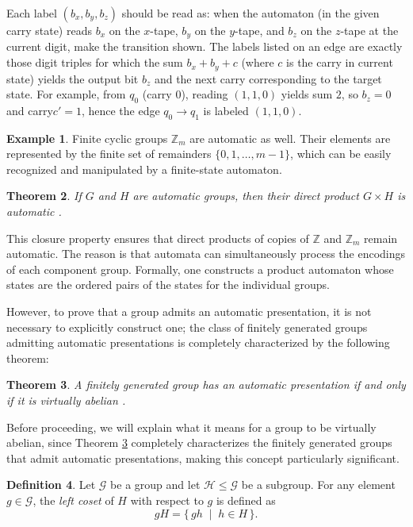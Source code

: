 \documentclass{pracalicmgr2025}
\theoremstyle{plain}            %
\newtheorem{theorem}{Theorem}[chapter]
\theoremstyle{remark}           %
\theoremstyle{definition}       %
\newtheorem{example}[theorem]{Example}
\newtheorem{definition}[theorem]{Definition}
\begin{document}
Each label $(b_x,b_y,b_z)$ should be read as: when the automaton (in the given carry state) reads $b_x$ on the $x$-tape, $b_y$ on the $y$-tape, and $b_z$ on the $z$-tape at the current digit, make the transition shown. The labels listed on an edge are exactly those digit triples for which the sum $b_x+b_y+c$ (where $c$ is the carry in current state) yields the output bit $b_z$ and the next carry corresponding to the target state. For example, from $q_0$ (carry $0$), reading $(1,1,0)$ yields sum $2$, so $b_z=0$ and carry$c' =1$, hence the edge $q_0\to q_1$ is labeled $(1,1,0)$.
\bigskip

\begin{example}
Finite cyclic groups $\mathbb{Z}_m$ are automatic as well.  
Their elements are represented by the finite set of remainders $\{0,1,\dots,m-1\}$, which can be 
easily recognized and manipulated by a finite-state automaton. 
\end{example}

\begin{theorem}
If $G$ and $H$ are automatic groups, then their direct product $G \times H$ is automatic \cite{hopcroft2001introduction}. 
\end{theorem}

This closure property ensures that direct products of copies of $\mathbb{Z}$ and $\mathbb{Z}_m$ remain automatic.  
The reason is that automata can simultaneously process the encodings of each component group. 
Formally, one constructs a product automaton whose states are the ordered pairs of the states for the individual groups.



However, to prove that a group admits an automatic presentation, it is not necessary to explicitly construct one; the class of finitely generated groups admitting automatic presentations is completely characterized by the following theorem:
\begin{theorem} \label{virtully abelina}
    A finitely generated group has an automatic presentation if and only if it is virtually abelian \cite{OliverGraham2005}.
\end{theorem}
Before proceeding, we will explain what it means for a group to be virtually abelian, since Theorem \ref{virtully abelina} completely characterizes the finitely generated groups that admit automatic presentations, making this concept particularly significant.
\begin{definition}
Let $\mathcal{G}$ be a group and let $\mathcal{H} \leq \mathcal{G}$ be a subgroup. 
For any element $g \in \mathcal{G}$, the \emph{left coset} of $H$ with respect to $g$ is defined as
\[
gH = \{ \, gh \;\mid\; h \in H \,\}.
\]
\end{definition}
\end{document}
